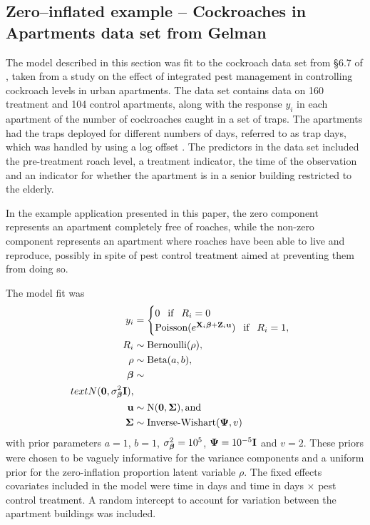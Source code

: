 			\subsection{Zero--inflated example -- Cockroaches in Apartments data set from Gelman}
			The model described in this section was fit
			 to the cockroach data set from \S 6.7 of \citep{Gelman2007}, taken from a study
			on the effect of integrated pest management in controlling cockroach levels in urban apartments. The data
			set contains data on 160 treatment and 104 control apartments, along with the response $y_i$ in each
			apartment of the number of cockroaches caught in a set of traps. The apartments had the traps deployed for
			different numbers of days, referred to as trap days, which was handled by using a log offset
			\citep{Agresti2002}. The predictors in the data set included the pre-treatment roach level, a treatment
			indicator, the time of the observation and an indicator for whether the apartment is in a senior building
			restricted to the elderly.
					
			In the example application presented in this paper, the zero component represents an apartment completely free of roaches, while the non-zero component represents an apartment where roaches have been able to live and reproduce, possibly in spite of pest control treatment aimed at preventing them from doing so.

			The model fit was
			\begin{align*}
				y_i &= \begin{cases}
				0 \phantom{-} \text{if} \phantom{-} R_i = 0 \\
				\text{Poisson}(e^{{\bf X}_i {\boldsymbol \beta} + {\bf Z}_i {\bf u}}) \phantom{-} \text{if} \phantom{-} R_i = 1,
				\end{cases} \\
				R_i &\sim \text{Bernoulli}(\rho), \\
				\rho &\sim \text{Beta}(a, b), \\
				{\boldsymbol \beta} &\sim \\text{N}({\bf 0}, \sigma^2_{\boldsymbol \beta} {\bf I}), \\
				{\bf u} &\sim \text{N}({\bf 0}, {\boldsymbol \Sigma}), \text{and} \\
				{\boldsymbol \Sigma} &\sim \text{Inverse-Wishart}({\boldsymbol \Psi}, v)
			\end{align*}
			with prior parameters $a = 1$, $b = 1$, $\sigma^2_{\boldsymbol \beta} = 10^5$, ${\boldsymbol \Psi} = 10^{-5} {\bf I}$ and $v = 2$.
			These priors were chosen to be vaguely informative for the variance components and a uniform prior for
			the zero-inflation proportion latent variable $\rho$. The fixed effects covariates included in the
			model were time in days and time in days $\times$ pest control treatment. A random intercept to account
			for variation between the apartment buildings was included.
					
